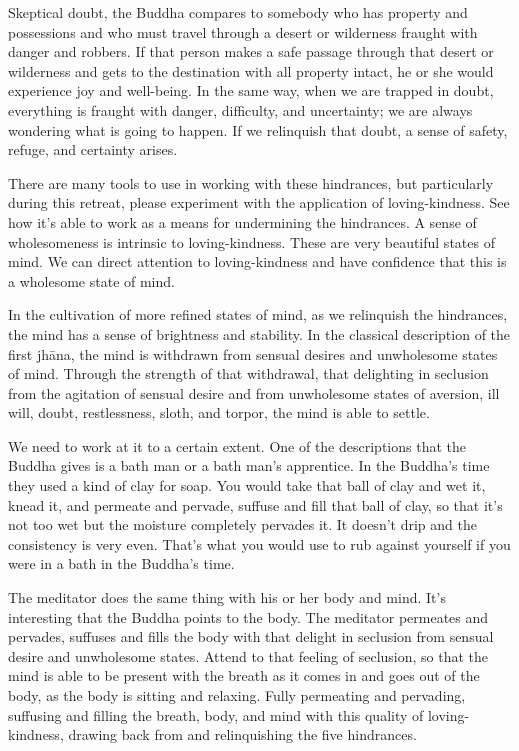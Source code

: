 Skeptical doubt, the Buddha compares to somebody who has property and
possessions and who must travel through a desert or wilderness fraught
with danger and robbers. If that person makes a safe passage through
that desert or wilderness and gets to the destination with all property
intact, he or she would experience joy and well-being. In the same way,
when we are trapped in doubt, everything is fraught with danger,
difficulty, and uncertainty; we are always wondering what is going to
happen. If we relinquish that doubt, a sense of safety, refuge, and
certainty arises.

There are many tools to use in working with these hindrances, but
particularly during this retreat, please experiment with the application
of loving-kindness. See how it’s able to work as a means for undermining
the hindrances. A sense of wholesomeness is intrinsic to
loving-kindness. These are very beautiful states of mind. We can direct
attention to loving-kindness and have confidence that this is a
wholesome state of mind.

In the cultivation of more refined states of mind, as we relinquish the
hindrances, the mind has a sense of brightness and stability. In the
classical description of the first jhāna, the mind is withdrawn from
sensual desires and unwholesome states of mind. Through the strength of
that withdrawal, that delighting in seclusion from the agitation of
sensual desire and from unwholesome states of aversion, ill will, doubt,
restlessness, sloth, and torpor, the mind is able to settle.

We need to work at it to a certain extent. One of the descriptions that
the Buddha gives is a bath man or a bath man’s apprentice. In the
Buddha’s time they used a kind of clay for soap. You would take that
ball of clay and wet it, knead it, and permeate and pervade, suffuse and
fill that ball of clay, so that it’s not too wet but the moisture
completely pervades it. It doesn’t drip and the consistency is very
even. That’s what you would use to rub against yourself if you were in a
bath in the Buddha’s time.

The meditator does the same thing with his or her body and mind. It’s
interesting that the Buddha points to the body. The meditator permeates
and pervades, suffuses and fills the body with that delight in seclusion
from sensual desire and unwholesome states. Attend to that feeling of
seclusion, so that the mind is able to be present with the breath as it
comes in and goes out of the body, as the body is sitting and relaxing.
Fully permeating and pervading, suffusing and filling the breath, body,
and mind with this quality of loving-kindness, drawing back from and
relinquishing the five hindrances.


